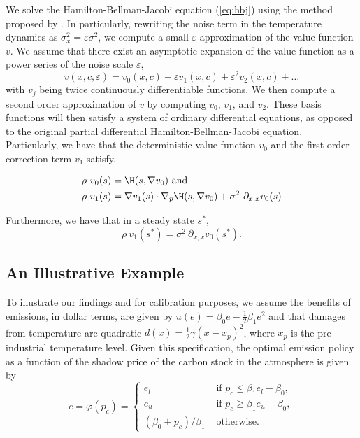 \documentclass[../../main.tex]{subfiles}
\begin{document}
We solve the Hamilton-Bellman-Jacobi equation (\ref{eq:hbj}) using the method proposed by \citep{grass_small-noise_2015}. In particularly, rewriting the noise term in the temperature dynamics as $\sigma_x^2 = \varepsilon \sigma^2$, we compute a small $\varepsilon$ approximation of the value function $v$. We assume that there exist an asymptotic expansion of the value function as a power series of the noise scale $\varepsilon$, \begin{equation}
    v(x, c, \varepsilon) = v_0(x, c) + \varepsilon v_1(x, c) + \varepsilon^2 v_2(x, c) + \ldots
\end{equation} with $v_j$ being twice continuously differentiable functions. We then compute a second order approximation of $v$ by computing $v_0$, $v_1$, and $v_2$. These basis functions will then satisfy a system of ordinary differential equations, as opposed to the original partial differential Hamilton-Bellman-Jacobi equation. Particularly, we have that the deterministic value function $v_0$ and the first order correction term $v_1$ satisfy,

\begin{align}
    \rho \ v_0(s) &= \H(s, \nabla v_0) \text{ and } \\
    \rho \ v_1(s) &= \nabla v_1(s) \cdot \nabla_p\H(s, \nabla v_0) + \sigma^2 \ \partial_{x, x} v_0(s)
\end{align}

Furthermore, we have that in a steady state $s^*$, \begin{equation}
    \rho \ v_1(s^*) = \sigma^2 \ \partial_{x, x} v_0(s^*).
\end{equation}

\subsection{An Illustrative Example}

To illustrate our findings and for calibration purposes, we assume the benefits of emissions, in dollar terms, are given by $u(e) = \beta_0 e - \frac{1}{2} \beta_1 e^2$ and that damages from temperature are quadratic $d(x) = \frac{1}{2}\gamma (x - x_p)^2$, where $x_p$ is the pre-industrial temperature level. Given this specification, the optimal emission policy as a function of the shadow price of the carbon stock in the atmosphere is given by \begin{equation}
    e = \varphi(p_c) = \begin{cases}
        e_l &\text{ if } p_c \leq \beta_1 e_l - \beta_0, \\
        e_u &\text{ if } p_c \geq \beta_1 e_u - \beta_0,\\
        (\beta_0 + p_c) / \beta_1  &\text{ otherwise.}
    \end{cases}
\end{equation}
\end{document}
